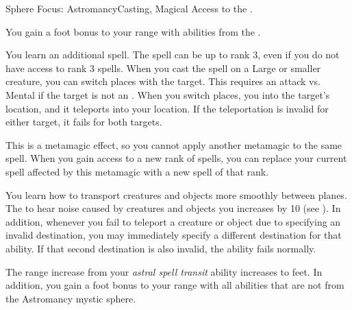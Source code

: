   \begin{magicalfeat}{Sphere Focus: Astromancy}{Casting, Magical}
    \featpre Access to the  .

     You gain a  foot bonus to your range with abilities from the  .

     You learn an additional  spell.
    The spell can be up to rank 3, even if you do not have access to rank 3 spells.
    When you cast the spell on a Large or smaller creature, you can switch places with the target.
    This requires an attack vs. Mental if the target is not an .
    When you switch places, you  into the target's location, and it teleports into your location.
    If the teleportation is invalid for either target, it fails for both targets.

    This is a metamagic effect, so you cannot apply another metamagic to the same spell.
    When you gain access to a new rank of spells, you can replace your current spell affected by this metamagic with a new spell of that rank.

     You learn how to transport creatures and objects more smoothly between planes.
    The  to hear noise caused by creatures and objects you  increases by 10 (see ).
    In addition, whenever you fail to teleport a creature or object due to specifying an invalid destination, you may immediately specify a different destination for that ability.
    If that second destination is also invalid, the ability fails normally.

     The range increase from your \textit{astral spell transit} ability increases to  feet.
    In addition, you gain a  foot bonus to your range with all \magical abilities that are not from the Astromancy mystic sphere.
  \end{magicalfeat}

